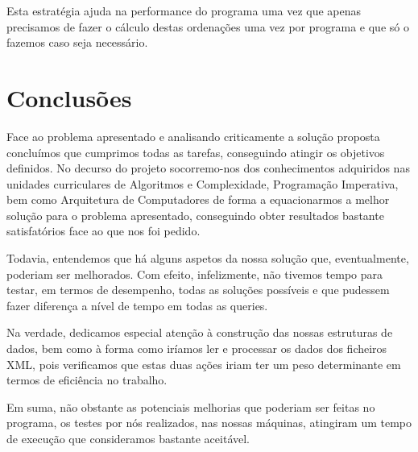 \documentclass[a4paper]{article}
\begin{document}
Esta estratégia ajuda na performance do programa uma vez que apenas precisamos
de fazer o cálculo destas ordenações uma vez por programa
e que só o fazemos caso seja necessário.


\section{Conclusões}
\label{sec:conclusao}

Face ao problema apresentado e analisando criticamente a solução proposta concluímos
que cumprimos todas as tarefas, conseguindo atingir os objetivos definidos. No decurso
do projeto socorremo-nos dos conhecimentos adquiridos nas unidades curriculares de
Algoritmos e Complexidade, Programação Imperativa, bem como Arquitetura de Computadores
de forma a equacionarmos a melhor solução para o problema apresentado, conseguindo
obter resultados bastante satisfatórios face ao que nos foi pedido. \par
Todavia, entendemos que há alguns aspetos da nossa solução que, eventualmente,
poderiam ser melhorados. Com efeito, infelizmente, não tivemos tempo para testar,
em termos de desempenho, todas as soluções possíveis e que pudessem fazer diferença
a nível de tempo em todas as queries.\par
Na verdade, dedicamos especial atenção à construção das nossas estruturas de dados,
bem como à forma como iríamos ler e processar os dados dos ficheiros XML, pois
verificamos que estas duas ações iriam ter um peso determinante em termos de
eficiência no trabalho. \par
Em suma, não obstante as potenciais melhorias que poderiam ser feitas no
programa, os testes por nós realizados, nas nossas máquinas, atingiram
um tempo de execução que consideramos bastante aceitável.
\end{document}
